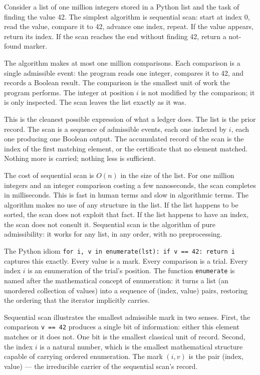 Consider a list of one million integers stored in a Python list and the task of
finding the value 42. The simplest algorithm is sequential scan: start at index
0, read the value, compare it to 42, advance one index, repeat. If the value
appears, return its index. If the scan reaches the end without finding 42,
return a not-found marker.

The algorithm makes at most one million comparisons. Each comparison is a
single admissible event: the program reads one integer, compares it to 42, and
records a Boolean result. The comparison is the smallest unit of work the
program performs. The integer at position $i$ is not modified by the
comparison; it is only inspected. The scan leaves the list exactly as it was.

This is the cleanest possible expression of what a ledger does. The list is the
prior record. The scan is a sequence of admissible events, each one indexed by
$i$, each one producing one Boolean output. The accumulated record of the scan
is the index of the first matching element, or the certificate that no element
matched. Nothing more is carried; nothing less is sufficient.

The cost of sequential scan is $O(n)$ in the size of the list. For one million
integers and an integer comparison costing a few nanoseconds, the scan completes
in milliseconds. This is fast in human terms and slow in algorithmic terms. The
algorithm makes no use of any structure in the list. If the list happens to be
sorted, the scan does not exploit that fact. If the list happens to have an
index, the scan does not consult it. Sequential scan is the algorithm of pure
admissibility: it works for any list, in any order, with no preprocessing.

The Python idiom \texttt{for i, v in enumerate(lst): if v == 42: return i}
captures this exactly. Every value is a mark. Every comparison is a trial.
Every index $i$ is an enumeration of the trial's position. The function
\texttt{enumerate} is named after the mathematical concept of enumeration: it
turns a list (an unordered collection of values) into a sequence of (index,
value) pairs, restoring the ordering that the iterator implicitly carries.

Sequential scan illustrates the smallest admissible mark in two senses. First,
the comparison \texttt{v == 42} produces a single bit of information: either
this element matches or it does not. One bit is the smallest classical unit of
record. Second, the index $i$ is a natural number, which is the smallest
mathematical structure capable of carrying ordered enumeration. The mark
$(i, v)$ is the pair (index, value) --- the irreducible carrier of the
sequential scan's record.

